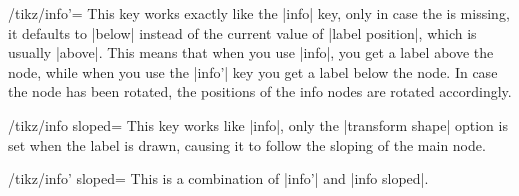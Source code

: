 \begin{key}{/tikz/info'=}
    This key works exactly like the |info| key, only in case the 
    is missing, it defaults to |below| instead of the current value of
    |label position|, which is usually |above|. This means that when you use
    |info|, you get a label above the node, while when you use the |info'| key
    you get a label below the node. In case the node has been rotated, the
    positions of the info nodes are rotated accordingly.
\begin{codeexample}[preamble={\usetikzlibrary{circuits.ee.IEC}}]
\end{codeexample}
\end{key}

\begin{key}{/tikz/info sloped=}
    This key works like |info|, only the |transform shape| option is set when
    the label is drawn, causing it to follow the sloping of the main node.
\begin{codeexample}[preamble={\usetikzlibrary{circuits.ee.IEC}}]
\end{codeexample}
\end{key}

\begin{key}{/tikz/info' sloped=}
    This is a combination of |info'| and |info sloped|.
\begin{codeexample}[preamble={\usetikzlibrary{circuits.ee.IEC}}]
\end{codeexample}
\end{key}

